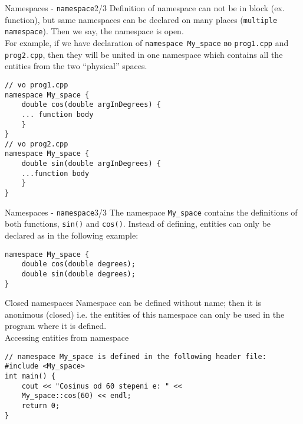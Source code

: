 \begin{frame}[fragile]{Namespaces - \texttt{namespace}}{2/3}
Definition of namespace can not be in block (ex. function), but same namespaces
can be declared on many places (\texttt{multiple namespace}). Then we say, the
namespace is open.\\
For example, if we have declaration of \texttt{namespace My\_space} во
\texttt{prog1.cpp} and \texttt{prog2.cpp}, then they will be united in one
namespace which contains all the entities from the two ``physical'' spaces.
\begin{lstlisting}
// vo prog1.cpp
namespace My_space {
    double cos(double argInDegrees) {
    ... function body
    }
}
// vo prog2.cpp
namespace My_space {
    double sin(double argInDegrees) {
    ...function body
    }
}
\end{lstlisting}
\end{frame}

\begin{frame}[fragile]{Namespaces - \texttt{namespace}}{3/3}
The namespace \texttt{My\_space} contains the definitions of both functions, 
\texttt{sin()} and \texttt{cos()}. Instead of defining, entities can only be
declared as in the following example:
\begin{lstlisting}
namespace My_space {
    double cos(double degrees);
    double sin(double degrees);
}
\end{lstlisting}
\end{frame}


\begin{frame}[fragile]{Closed namespaces}
Namespace can be defined without name; then it is anonimous (closed) i.e. the
entities of this namespace can only be used in the program where it is
defined.\\
Accessing entities from namespace
\begin{lstlisting}
// namespace My_space is defined in the following header file:
#include <My_space>
int main() {
    cout << "Cosinus od 60 stepeni e: " <<
    My_space::cos(60) << endl;
    return 0;
}
\end{lstlisting}
\end{frame}

